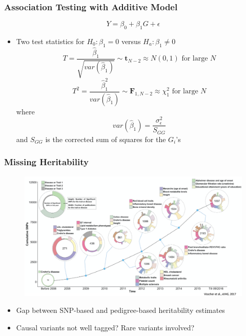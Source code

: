 \documentclass{beamer}
\begin{document}
\begin{frame}
	\frametitle{\bf Association Testing with Additive Model}
	\[ Y=\beta_{0} + \beta_{1}G + \epsilon \]
	\begin{itemize}
		\item Two test statistics for $H_0: \beta_{1}=0$ versus  $H_a: \beta_{1} \ne 0$ 
		\[T=\frac{\hat{\beta}_{1}}{\sqrt{var(\hat{\beta}_1)}} \sim \mathbf{t}_{N-2} \approx N(0,1) \mbox{ for large $N$}\]
		\[T^2=\frac{\hat{\beta}^2_{1}}{var(\hat{\beta}_1)} \sim \mathbf{F}_{1,N-2} \approx \chi^2_1\mbox{ for large $N$}\]
		where
		\[var(\hat{\beta}_1) =\frac{\sigma^2_{\epsilon}}{S_{GG}} \]
		and $S_{GG}$ is the corrected sum of squares for the $G_i$'s
	\end{itemize}
\end{frame}


\begin{frame}
	\frametitle{\bf Missing Heritability}	
	\vspace{-2em}
	\begin{figure}
		\centering
		\includegraphics[scale=.25]{Figures/gwas_discoveries}
	\end{figure}
	\begin{itemize}
		\item Gap between SNP-based and pedigree-based heritability estimates
		\item Causal variants not well tagged? Rare variants involved?
	\end{itemize}
\end{frame}
\end{document}
